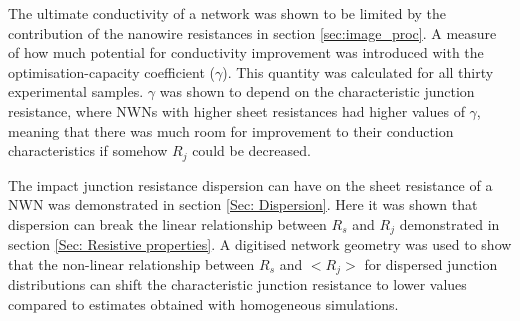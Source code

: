 The ultimate conductivity of a network was shown to be limited by the contribution of the nanowire resistances in section \ref{sec:image_proc}. A measure of how much potential for conductivity improvement was introduced with the optimisation-capacity coefficient ($\gamma$). This quantity was calculated for all thirty experimental samples. $\gamma$ was shown to depend on the characteristic junction resistance, where NWNs with higher sheet resistances had higher values of $\gamma$, meaning that there was much room for improvement to their conduction characteristics if somehow $R_j$ could be decreased.

The impact junction resistance dispersion can have on the sheet resistance of a NWN was demonstrated in section \ref{Sec: Dispersion}. Here it was shown that dispersion can break the linear relationship between $R_s$ and $R_j$ demonstrated in section \ref{Sec: Resistive properties}. A digitised network geometry was used to show that the non-linear relationship between $R_s$ and $<R_j>$ for dispersed junction distributions can shift the characteristic junction resistance to lower values compared to estimates obtained with homogeneous simulations. 

%


